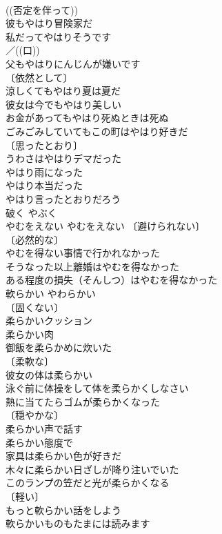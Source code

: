 \documentclass[8pt]{extreport}
\begin{document}
\begin{CJK}{UTF8}{min}
\\	((否定を伴って)) 
\\	彼もやはり冒険家だ 
\\	私だってやはりそうです 
\\	／((口))
\\	父もやはりにんじんが嫌いです 
\\	〔依然として〕
\\	涼しくてもやはり夏は夏だ 
\\	彼女は今でもやはり美しい 
\\	お金があってもやはり死ぬときは死ぬ 
\\	ごみごみしていてもこの町はやはり好きだ 
\\	〔思ったとおり〕
\\	うわさはやはりデマだった 
\\	やはり雨になった 
\\	やはり本当だった 
\\	やはり言ったとおりだろう 
\\	破く	やぶく	
\\	やむをえない	やむをえない	〔避けられない〕
\\	〔必然的な〕
\\	やむを得ない事情で行かれなかった 
\\	そうなった以上離婚はやむを得なかった 
\\	ある程度の損失（そんしつ）はやむを得なかった 
\\	軟らかい	やわらかい	
\\	〔固くない〕
\\	柔らかいクッション 
\\	柔らかい肉 
\\	御飯を柔らかめに炊いた 
\\	〔柔軟な〕
\\	彼女の体は柔らかい 
\\	泳ぐ前に体操をして体を柔らかくしなさい 
\\	熱に当てたらゴムが柔らかくなった 
\\	〔穏やかな〕
\\	柔らかい声で話す 
\\	柔らかい態度で 
\\	家具は柔らかい色が好きだ 
\\	木々に柔らかい日ざしが降り注いでいた 
\\	このランプの笠だと光が柔らかくなる 
\\	〔軽い〕
\\	もっと軟らかい話をしよう 
\\	軟らかいものもたまには読みます 

\end{CJK}
\end{document}
